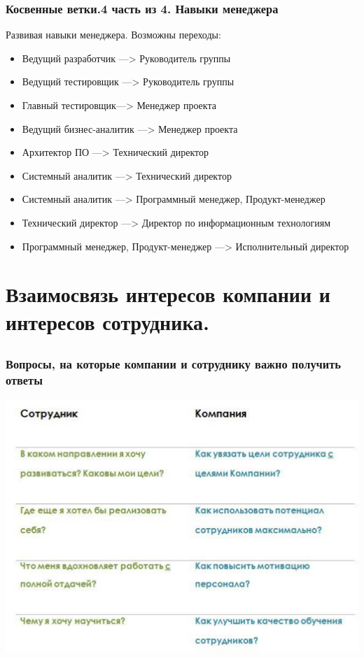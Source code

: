 \documentclass{../industrial-development}
\begin{document}
\begin{frame} \frametitle{Косвенные ветки.4 часть из 4. Навыки менеджера}

\begin{block}{Развивая навыки менеджера.}
Возможны переходы:
  \end{block}
\begin{itemize}
  \item Ведущий разработчик ---> Руководитель группы
  \item Ведущий тестировщик ---> Руководитель группы
\item Главный тестировщик---> Менеджер проекта
 \item Ведущий бизнес-аналитик ---> Менеджер проекта
  \item Архитектор ПО  ---> Технический директор
\item  Системный аналитик ---> Технический директор
 \item Системный аналитик ---> Программный менеджер, Продукт-менеджер
  \item Технический директор ---> Директор по информационным технологиям
\item  Программный менеджер, Продукт-менеджер  ---> Исполнительный директор
  \end{itemize}
\end{frame}





\section{Взаимосвязь интересов компании и интересов сотрудника. }

\subsection{}

\begin{frame} \frametitle{Вопросы, на которые компании и сотруднику важно получить ответы}
  \centerline{\includegraphics[height=0.82\textheight]{11-IT-specialist's-way/vop.pdf}}
\end{frame}
\end{document}
